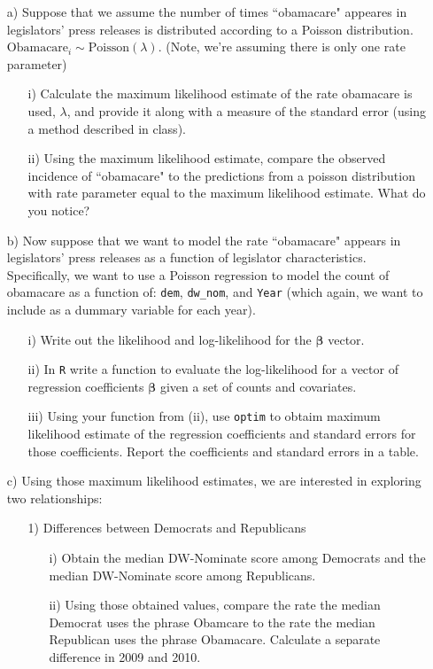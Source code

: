 \documentclass[letterpaper,12pt]{article}
\numberwithin{equation}{section}
\numberwithin{equation}{section}
\begin{document}
\begin{itemize}
\item[a)] Suppose that we assume the number of times ``obamacare" appeares in legislators' press releases is distributed according to a Poisson distribution. $\text{Obamacare}_{i} \sim \text{Poisson}(\lambda)$.   (Note, we're assuming there is only one rate parameter)
\begin{itemize}
\item[i)] Calculate the maximum likelihood estimate of the rate obamacare is used, $\lambda$, and provide it along with a measure of the standard error (using a method described in class).
\item[ii)] Using the maximum likelihood estimate, compare the observed incidence of ``obamacare" to the predictions from a poisson distribution with rate parameter equal to the maximum likelihood estimate.  What do you notice?
\end{itemize}
\item[b)] Now suppose that we want to model the rate ``obamacare" appears in legislators' press releases as a function of legislator characteristics.  Specifically, we want to use a Poisson regression to model the count of obamacare as a function of: {\tt dem}, {\tt dw\_nom}, and {\tt Year} (which again, we want to include as a dummary variable for each year).
\begin{itemize}
\item[i)] Write out the likelihood and log-likelihood for the $\boldsymbol{\beta}$ vector.
\item[ii)] In {\tt R} write a function to evaluate the log-likelihood for a vector of regression coefficients $\boldsymbol{\beta}$ given a set of counts and covariates.
\item[iii)] Using your function from (ii), use {\tt optim} to obtaim maximum likelihood estimate of the regression coefficients and standard errors for those coefficients.  Report the coefficients and standard errors in a table.
\end{itemize}
\item[c)] Using those maximum likelihood estimates, we are interested in exploring two relationships:
\begin{itemize}
\item[1)] Differences between Democrats and Republicans
\begin{itemize}
\item[i)] Obtain the median DW-Nominate score among Democrats and the median DW-Nominate score among Republicans.
\item[ii)] Using those obtained values, compare the rate the median Democrat uses the phrase Obamcare to the rate the median Republican uses the phrase Obamacare.  Calculate a separate difference in 2009 and 2010.

\end{itemize}
\end{itemize}
\end{itemize}
\end{document}
